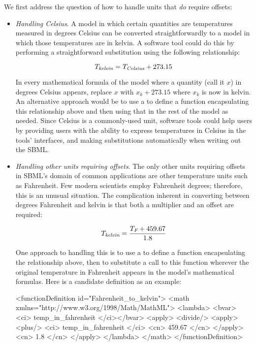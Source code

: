 We first address the question of how to handle units that
\emph{do} require offsets:
\begin{itemize}

\item \emph{Handling Celsius}.  A model in which certain
  quantities are temperatures measured in degrees Celsius can be
  converted straightforwardly to a model in which those
  temperatures are in kelvin.  A software tool could do this by
  performing a straightforward substitution using the following
  relationship:
  \begin{linenomath}
    \begin{equation*}
      T_\emph{kelvin} = T_\emph{Celsius} + 273.15
    \end{equation*}
  \end{linenomath}
  In every mathematical formula of the model where a quantity
  (call it $x$) in degrees Celsius appears, replace $x$ with $x_k
  + 273.15$ where $x_k$ is now in kelvin.  An alternative approach
  would be to use a \FunctionDefinition to define a function
  encapsulating this relationship above and then using that in the
  rest of the model as needed.  Since Celsius is a commonly-used
  unit, software tools could help users by providing users with
  the ability to express temperatures in Celsius in the tools'
  interfaces, and making substitutions automatically when writing
  out the SBML.

\item \emph{Handling other units requiring offsets}.  The only
  other units requiring offsets in SBML's domain of common
  applications are other temperature units such as Fahrenheit.
  Few modern scientists employ Fahrenheit degrees; therefore, this
  is an unusual situation.  The complication inherent in
  converting between degrees Fahrenheit and kelvin is that both a
  multiplier and an offset are required:
  \begin{linenomath}
    \begin{equation*}
      T_\emph{kelvin} = \frac{T_\emph{F} + 459.67}{1.8}
      \label{eq:fah-kelvin}
    \end{equation*}
  \end{linenomath}

  One approach to handling this is to use a \FunctionDefinition to
  define a function encapsulating the relationship above, then to
  substitute a call to this function wherever the original
  temperature in Fahrenheit appears in the model's mathematical
  formulas.  Here is a candidate definition as an example:
  \begin{example}
<functionDefinition id="Fahrenheit_to_kelvin">
    <math xmlns="http://www.w3.org/1998/Math/MathML">
        <lambda>
            <bvar><ci> temp_in_fahrenheit </ci></bvar>
            <apply>
                <divide/>
                <apply>
                    <plus/>
                    <ci> temp_in_fahrenheit </ci>
                    <cn> 459.67 </cn>
                </apply>
                <cn> 1.8 </cn>
            </apply>
        </lambda>
    </math>
</functionDefinition>
  \end{example}
  

\end{itemize}
